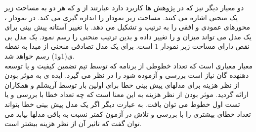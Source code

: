 دو معیار دیگر نیز که در پژوهش ها کاربرد دارد عبارتند از 
   و 
 
که هر دو به مساحت زیر یک منحنی اشاره می کنند.   مساحت زیر نمودار
   
را اندازه گیری می کند. در نمودار ،  محورهای عمودی و افقی را به ترتیب  و   تشکیل می دهد.  با تغییر آستانه پیش بینی برای یک مدل می تواند میزان  و  را تغییر داده و بدین ترتیب منحنی  را رسم نمود. یک مدل بی نقص دارای مساحت زیر نمودار 1 است. برای یک مدل تصادفی  منحنی از مبدا به نقطه ی(1و1) رسم خواهد شد. \\
معیار  معیاری است که تعداد خطوطی از برنامه که  توسط تیم تضمین کیفیت و یا توسعه دهنهده گان نیاز است بررسی و آزموده شود را در نظر می گیرد. ایده ی به موثر بودن از نظر هزینه 
برای مدلهای پیش بینی خطا برای اولین بار توسط آریشلم و همکاران \cite{arisholm2007data} ارائه گردید. موثر بودن از نظر هزینه به این معنا است که چه تعداد خطا با بررسی و یا تست   اول خطوط می توان یافت. به عبارت دیگر اگر یک مدل پیش بینی خطا بتواند تعداد خطای بیشتری را با بررسی و تلاش در آزمون کمتر نسبت به باقی مدلها بیابد می توان گفت که تاثیر آن از نظر هزینه بیشتر است. 